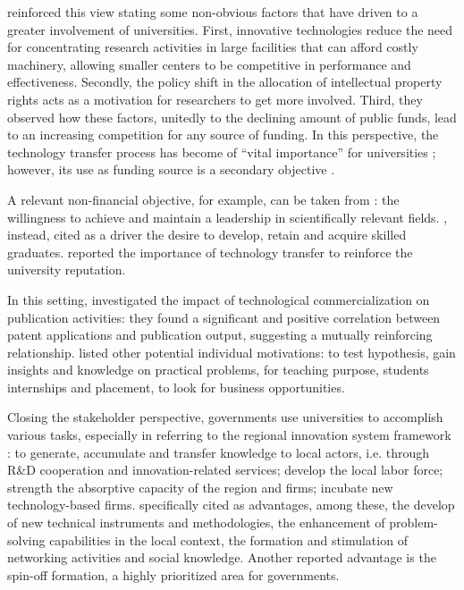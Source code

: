 \citet{Baldini2007} reinforced this view stating some non-obvious factors that have driven to a greater involvement of universities. First, innovative technologies reduce the need for concentrating research activities in large facilities that can afford costly machinery, allowing smaller centers to be competitive in performance and effectiveness. Secondly, the policy shift in the allocation of intellectual property rights acts as a motivation for researchers to get more involved. Third, they observed how these factors, unitedly to the declining amount of public funds, lead to an increasing competition for any source of funding. In this perspective, the technology transfer process has become of \enquote{vital importance} for universities \citep{Muscio2008}; however, its use as funding source is a secondary objective \citep{Jensen1998}.

A relevant non-financial objective, for example, can be taken from \citet{Tijssen2006}: the willingness to achieve and maintain a leadership in scientifically relevant fields. \citet{Leitch2005}, instead, cited as a driver the desire to develop, retain and acquire skilled graduates. \citet{Baldini2006} reported the importance of technology transfer to reinforce the university reputation. 

In this setting, \citet{Wong2010} investigated the impact of technological commercialization on publication activities: they found a significant and positive correlation between patent applications and publication output, suggesting a mutually reinforcing relationship. \citet{Lee2000} listed other potential individual motivations: to test hypothesis, gain insights and knowledge on practical problems, for teaching purpose, students internships and placement, to look for business opportunities. 

Closing the stakeholder perspective, governments use universities to accomplish various tasks, especially in referring to the regional innovation system framework \citep{Fritsch2007,Balderi2007}: to generate, accumulate and transfer knowledge to local actors, i.e. through R\&D cooperation and innovation-related services; develop the local labor force; strength the absorptive capacity of the region and firms; incubate new technology-based firms. \citet{AzagraCaro2010} specifically cited as advantages, among these, the develop of new technical instruments and methodologies, the enhancement of problem-solving capabilities in the local context, the formation and stimulation of networking activities and social knowledge. Another reported advantage is the spin-off formation, a highly prioritized area for governments.

